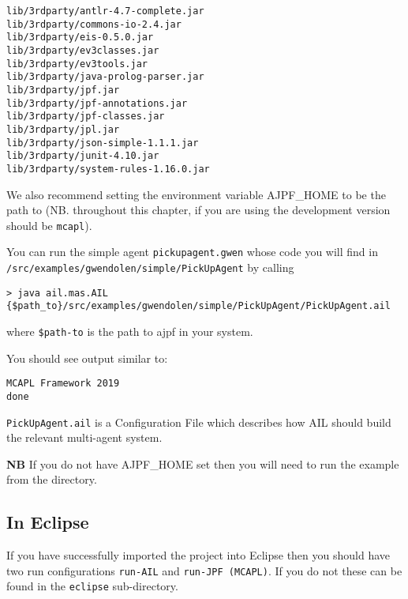 \begin{verbatim}
lib/3rdparty/antlr-4.7-complete.jar
lib/3rdparty/commons-io-2.4.jar
lib/3rdparty/eis-0.5.0.jar
lib/3rdparty/ev3classes.jar
lib/3rdparty/ev3tools.jar
lib/3rdparty/java-prolog-parser.jar
lib/3rdparty/jpf.jar
lib/3rdparty/jpf-annotations.jar
lib/3rdparty/jpf-classes.jar
lib/3rdparty/jpl.jar
lib/3rdparty/json-simple-1.1.1.jar
lib/3rdparty/junit-4.10.jar
lib/3rdparty/system-rules-1.16.0.jar
\end{verbatim}

We also recommend setting the environment variable AJPF\_HOME to be the path to \texttt{\ajpfversion} (NB. throughout this chapter, if you are using the development version \texttt{\ajpfversion} should be \texttt{mcapl}).

You can run the simple agent \texttt{pickupagent.gwen} whose code you will find in \texttt{/src/examples/gwendolen/simple/PickUpAgent} by calling

\noindent \begin{lstlisting}[basicstyle=\tiny]
> java ail.mas.AIL {$path_to}/src/examples/gwendolen/simple/PickUpAgent/PickUpAgent.ail
\end{lstlisting}
\medskip

\noindent where \texttt{\${path-to}} is the path to ajpf in your system.

You should see output similar to:

\noindent \begin{lstlisting}
MCAPL Framework 2019
done
\end{lstlisting}
\medskip
 
\texttt{PickUpAgent.ail} is a Configuration File which describes how AIL should build the relevant multi-agent system.

{\bf NB}  If you do not have AJPF\_HOME set then you will need to run the example from the \texttt{\ajpfversion} directory.

\subsection{In Eclipse}

If you have successfully imported the project into Eclipse then you should have two run configurations \texttt{run-AIL} and \texttt{run-JPF (MCAPL)}.  If you do not these can be found in the \texttt{eclipse} sub-directory.


